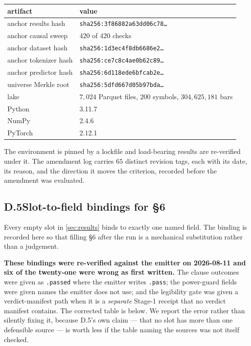 \begin{center}
\small
\begin{tabularx}{\linewidth}{lX}
\toprule
artifact & value \\
\midrule
anchor results hash & \texttt{sha256:3f86882a63dd06c78\ldots} \\
anchor causal sweep & $420$ of $420$ checks \\
anchor dataset hash & \texttt{sha256:1d3ec4f8db6686e2\ldots} \\
anchor tokenizer hash & \texttt{sha256:ce7c8c4ae0b62c89\ldots} \\
anchor predictor hash & \texttt{sha256:6d118ede6bfcab2e\ldots} \\
universe Merkle root & \texttt{sha256:5dfd667d05b97bda\ldots} \\
lake & $7{,}024$ Parquet files, $200$ symbols, $304{,}625{,}181$ bars \\
Python & 3.11.7 \\
NumPy & 2.4.6 \\
PyTorch & 2.12.1 \\
\bottomrule
\end{tabularx}
\end{center}

The environment is pinned by a lockfile and load-bearing results are re-verified under it. The
amendment log carries $65$ distinct revision tags, each with its date, its reason, and the
direction it moves the criterion, recorded before the amendment was evaluated.

\subsection*{D.5\quad Slot-to-field bindings for \S6}

Every empty slot in \cref{sec:results} binds to exactly one named field. The binding is recorded
here so that filling \S6 after the run is a mechanical substitution rather than a judgement.

\textbf{These bindings were re-verified against the emitter on 2026-08-11 and six of the
twenty-one were wrong as first written.} The clause outcomes were given as \texttt{.passed} where
the emitter writes \texttt{.pass}; the power-guard fields were given names the emitter does not
use; and the legibility gate was given a verdict-manifest path when it is a \emph{separate}
Stage-1 receipt that no verdict manifest contains. The corrected table is below. We report the
error rather than silently fixing it, because D.5's own claim --- that no slot has more than one
defensible source --- is worth less if the table naming the sources was not itself checked.

